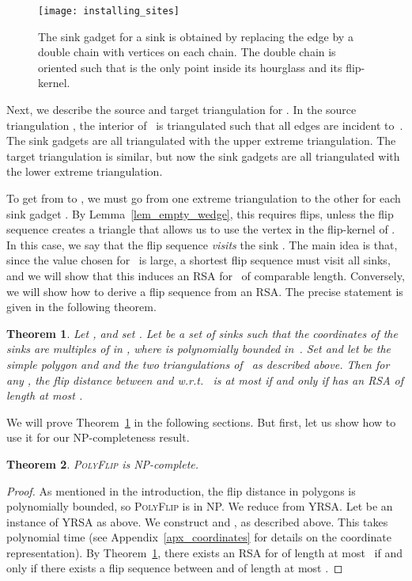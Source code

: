 \documentclass[a4paper,11pt]{article}
\newtheorem{theorem}{Theorem}[section]
\newcommand{\qedopt}{}
\begin{document}
\begin{figure}
\centering
\texttt{[image: installing\_sites]}
\caption{
The sink gadget for a sink  is obtained by replacing the edge
 by a double chain with  vertices on
each chain. The double chain is oriented such that  is the
only point inside its hourglass and its flip-kernel. }
\label{fig_installing_sites}
\end{figure}

Next, we describe the source and target triangulation for .
In the source triangulation , the interior of~ is triangulated 
such that all edges are incident to~. 
The sink gadgets are all triangulated with the upper extreme triangulation.
The target triangulation  is similar, but now the sink gadgets 
are all triangulated with the lower extreme triangulation.


To get from  to , we must go from one extreme
triangulation to the other for each sink gadget . 
By Lemma~\ref{lem_empty_wedge},
this requires  flips, unless the flip sequence creates a
triangle that allows us to use the vertex in the flip-kernel of
. In this case, we say that the flip sequence \emph{visits}
the sink .
The main idea is that, since the value chosen for~ is large, a shortest flip sequence must visit all sinks, 
and we  will show that this induces an RSA for~ of comparable length.
Conversely, we will show how to derive a flip sequence from an 
RSA.
The precise statement is given in the following theorem.

\begin{theorem}\label{thm:YRSA<->FlipDist}
Let , and
set .
Let  be a set of  sinks such that
the coordinates of
the sinks are multiples of  in , where  is polynomially bounded in~.
Set  and let  be the simple polygon and  and 
the two triangulations of~ as described above.
Then for any , the flip distance between  and
 w.r.t.~ is at most  if and only
if
 has an RSA of length at most .
\end{theorem}

We will prove Theorem~\ref{thm:YRSA<->FlipDist} in the following
sections. But first, let us show how to use it for our NP-completeness
result.
\begin{theorem}
\textup{\textsc{PolyFlip}} is \textup{NP}-complete.
\end{theorem}
\begin{proof}
As mentioned in the introduction, the flip distance in polygons is
polynomially bounded, so \textsc{PolyFlip} is in NP. 
We reduce from YRSA.
Let  be an instance of YRSA as above. 
We construct  and ,  as described above.
This takes polynomial time (see Appendix~\ref{apx_coordinates} for details on the coordinate representation).
By Theorem~\ref{thm:YRSA<->FlipDist}, 
there exists an RSA for  of length at most~ if and only if there exists a flip sequence between  and  of length at most
. 
\qedopt
\end{proof}
\end{document}
